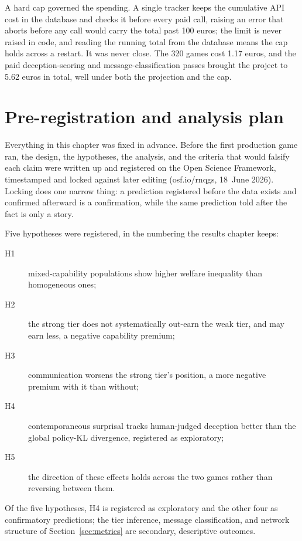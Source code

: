 A hard cap governed the spending. A single tracker keeps the cumulative API cost
in the database and checks it before every paid call, raising an error that aborts
before any call would carry the total past 100 euros; the limit is never raised in
code, and reading the running total from the database means the cap holds across a
restart. It was never close. The 320 games cost 1.17 euros, and the paid
deception-scoring and message-classification passes brought the project to 5.62
euros in total, well under both the projection and the cap.

\section{Pre-registration and analysis plan}
\label{sec:prereg}

Everything in this chapter was fixed in advance. Before the first production game
ran, the design, the hypotheses, the analysis, and the criteria that would
falsify each claim were written up and registered on the Open Science Framework,
timestamped and locked against later editing (osf.io/rnqgs, 18~June 2026). Locking
does one narrow thing: a prediction registered before the data
exists and confirmed afterward is a confirmation, while the same prediction told
after the fact is only a story.

Five hypotheses were registered, in the numbering the results chapter keeps:
\begin{description}
  \item[H1] mixed-capability populations show higher welfare inequality than
    homogeneous ones;
  \item[H2] the strong tier does not systematically out-earn the weak tier, and
    may earn less, a negative capability premium;
  \item[H3] communication worsens the strong tier's position, a more negative
    premium with it than without;
  \item[H4] contemporaneous surprisal tracks human-judged deception better than
    the global policy-KL divergence, registered as exploratory;
  \item[H5] the direction of these effects holds across the two games rather than
    reversing between them.
\end{description}
Of the five hypotheses, H4 is registered as exploratory and the other four as
confirmatory predictions; the tier inference, message classification, and network
structure of Section~\ref{sec:metrics} are secondary, descriptive outcomes.

